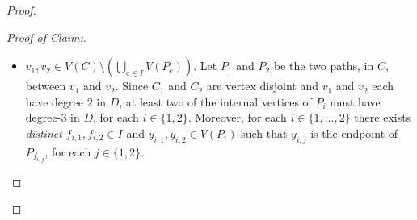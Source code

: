 \documentclass{patmorin}
\newenvironment{clmproof}{\begin{proof}[Proof of Claim:]\renewcommand{\qedsymbol}{\rule{1ex}{1ex}}}{\end{proof}}
\DeclareMathOperator{\buffer}{buffer}
\DeclareMathOperator{\proj}{proj}
\DeclareMathOperator{\spn}{span}
\DeclareMathOperator{\dist}{dist}
\begin{document}
\begin{proof}
\begin{clmproof}
\begin{itemize}
      Let $P':=\{\proj_{U_d}(v):v\in V(P)\}$.  Observe that, for each $v\in P$,
      \begin{align*}
        \dist_G(v_2,\proj_{U_d}(v))
          & \le \dist_G(v_2,\proj_{U_d}(v)) \\
          & \le \dist_G(v_2,\proj_{U_d}(v)) \\
          & \le \dist_G(v_2,v)+\dist_G(v,\proj_{U_d}(v)) \\
          & = \dist_G(v_2,v)+\dist_G(v,V(C)) \\
          & \le \dist_G(v_2,v)+\dist_G(v,v_1) \\
          & = |P| \\
          & \le d \enspace .
      \end{align*}
      Since $\spn_{U_d}(G_d)\le\ell$, At least one of $P_1-P'$ or $P_2-P'$ consists entirely of paths whose length is at most $\ell-2$. Without loss of generality, suppose $P_1-P'$ consists entirely of paths each having length at most $\ell-2$.  Then $B_C(y_1,\lfloor\ell/2\rfloor)$ contains a subpath of $P_1$ that contains $x\in P'$, that contains $v_1\in P'$, or that has length at least $2\lfloor\ell/2\rfloor\ge \ell-1$. In each of these cases, $B_C(y_1,\lfloor\ell/2\rfloor)$ contains a vertex $v'\in P'$. Since $\dist_G(v_2,v')\le d$, we have
      \[
        \emptyset \subsetneq B_G(v_2,\lceil d/2\rceil)\cap B_G(v_2,\lceil d/2\rceil) \subseteq \buffer(e_2)\cap\buffer(f_1) \enspace ,
      \]
      contradicting the assumption that $e_2$ and $f_1$ are both in $I$.

      \item $v_1,v_2\in V(C)\setminus(\bigcup_{e\in I}V(P_e))$. Let $P_1$ and $P_2$ be the two paths, in $C$, between $v_1$ and $v_2$.  Since $C_1$ and $C_2$ are vertex disjoint and $v_1$ and $v_2$ each have degree $2$ in $D$, at least two of the internal vertices of $P_i$ must have degree-$3$ in $D$, for each $i\in\{1,2\}$. Moreover, for each $i\in\{1,\ldots,2\}$ there exists \emph{distinct} $f_{i,1},f_{i,2}\in I$ and $y_{i,1},y_{i,2}\in V(P_i)$ such that $y_{i,j}$ is the endpoint of $P_{f_{i,j}}$, for each $j\in\{1,2\}$.


\end{itemize}
\end{clmproof}
\end{proof}
\end{document}
